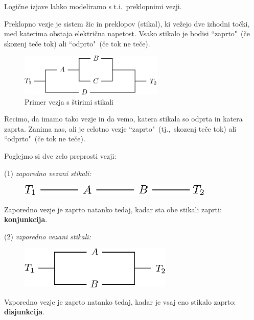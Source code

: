 \documentclass[11pt,paper=b5,footinclude,headinclude]{scrbook} %
\begin{document}
Logične izjave lahko modeliramo s t.i.~preklopnimi vezji.

Preklopno vezje je sistem žic in preklopov (stikal), ki vežejo dve
izhodni točki, med katerima obstaja električna napetost.
Vsako stikalo je bodisi ``zaprto"~(če skozenj teče tok) ali
``odprto"~(če tok ne teče).

\begin{figure}[h!]
\begin{center}
\includegraphics[height=20mm]{vezje.eps}
\caption{Primer vezja s štirimi stikali}\label{fig:vezje}
\end{center}
\end{figure}

Recimo, da imamo tako vezje in da vemo, katera stikala so odprta in katera zaprta.
Zanima nas, ali je celotno vezje ``zaprto"~(tj.,~skozenj teče tok) ali ``odprto"~(če
tok ne teče).


Poglejmo si dve zelo preprosti vezji:

(1) {\em zaporedno vezani stikali:}

\begin{figure}[h!]
\begin{center}
\includegraphics[height=5mm]{vezje-zaporedno.eps}\label{fig:vezje-zap}
\end{center}
\end{figure}

Zaporedno vezje je zaprto natanko tedaj, kadar sta obe stikali zaprti: \textbf{ konjunkcija}.

(2) {\em vzporedno vezani stikali:}

\begin{figure}[h!]
\begin{center}
\includegraphics[height=20mm]{vezje-vzporedno.eps}\label{fig:vezje-vzp}
\end{center}
\end{figure}

Vzporedno vezje je zaprto natanko tedaj, kadar je vsaj eno stikalo zaprto:
\textbf{ disjunkcija}.
\end{document}
